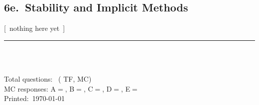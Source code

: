 \documentclass[10pt]{article}
\newcounter{totalQ}\setcounter{totalQ}{1}
\newcounter{totalTF}\setcounter{totalTF}{0}
\newcounter{totalMC}\setcounter{totalMC}{0}
\newcounter{Acount}\setcounter{Acount}{0}
\newcounter{Bcount}\setcounter{Bcount}{0}
\newcounter{Ccount}\setcounter{Ccount}{0}
\newcounter{Dcount}\setcounter{Dcount}{0}
\newcounter{Ecount}\setcounter{Ecount}{0}
\newcommand{\mysecnum}{0}
\newcommand{\mysubhead}[2]{%
  \subsection*{{\sffamily\bfseries #1.~#2}}\renewcommand{\mysecnum}{#1}}
\begin{document}
\mysubhead{6e}{Stability and Implicit Methods}

[~nothing here yet~]
  
\vfill

\noindent
\rule{\textwidth}{0.5pt}\\

\noindent
\underline{}\\[0.3cm]
\noindent
\addtocounter{totalQ}{-1}
Total questions:~ ( TF, 
MC)\\
\noindent
MC responses: A$=$,  
B$=$,  
C$=$,  
D$=$, 
E$=$\\ 

\noindent
Printed:~\today

\end{document}
